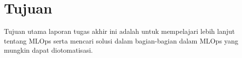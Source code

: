 \section{Tujuan}

Tujuan utama laporan tugas akhir ini adalah untuk mempelajari lebih lanjut tentang MLOps serta mencari solusi dalam bagian-bagian dalam MLOps yang mungkin dapat diotomatisasi.  